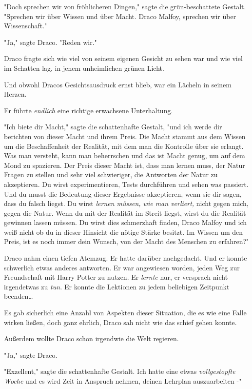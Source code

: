 {"Doch sprechen wir von fröhlicheren Dingen," sagte die grün-beschattete Gestalt. "Sprechen wir über Wissen und über Macht. Draco Malfoy, sprechen wir über Wissenschaft."

"Ja," sagte Draco. "Reden wir."

Draco fragte sich wie viel von seinem eigenen Gesicht zu sehen war und wie viel im Schatten lag, in jenem unheimlichen grünen Licht.

Und obwohl Dracos Gesichtsausdruck ernst blieb, war ein Lächeln in seinem Herzen.

Er führte \emph{endlich} eine richtige erwachsene Unterhaltung.

"Ich biete dir Macht," sagte die schattenhafte Gestalt, "und ich werde dir berichten von dieser Macht und ihrem Preis. Die Macht stammt aus dem Wissen um die Beschaffenheit der Realität, mit dem man die Kontrolle über sie erlangt. Was man versteht, kann man beherrschen und das ist Macht genug, um auf dem Mond zu spazieren. Der Preis dieser Macht ist, dass man lernen muss, der Natur Fragen zu stellen und sehr viel schwieriger, die Antworten der Natur zu akzeptieren. Du wirst experimentieren, Tests durchführen und sehen was passiert. Und du musst die Bedeutung dieser Ergebnisse akzeptieren, wenn sie dir sagen, dass du falsch liegst. Du wirst \emph{lernen müssen, wie man verliert,} nicht gegen mich, gegen die Natur. Wenn du mit der Realität im Streit liegst, wirst du die Realität gewinnen lassen müssen. Du wirst dies schmerzhaft finden, Draco Malfoy und ich weiß nicht ob du in dieser Hinsicht die nötige Stärke besitzt. Im Wissen um den Preis, ist es noch immer dein Wunsch, von der Macht des Menschen zu erfahren?"

Draco nahm einen tiefen Atemzug. Er hatte darüber nachgedacht. Und er konnte schwerlich etwas anderes antworten. Er war angewiesen worden, jeden Weg zur Freundschaft mit Harry Potter zu nutzen. Er \emph{lernte} nur, er versprach nicht irgendetwas zu \emph{tun.} Er konnte die Lektionen zu jedem beliebigen Zeitpunkt beenden…

Es gab sicherlich eine Anzahl von Aspekten dieser Situation, die es wie eine Falle wirken ließen, doch ganz ehrlich, Draco sah nicht wie das schief gehen konnte.

Außerdem wollte Draco schon irgendwie die Welt regieren.

"Ja," sagte Draco.

"Exzellent," sagte die schattenhafte Gestalt. Ich hatte eine etwas \emph{vollgestopfte Woche} und es wird Zeit in Anspruch nehmen, deinen Lehrplan auszuarbeiten -"

}
